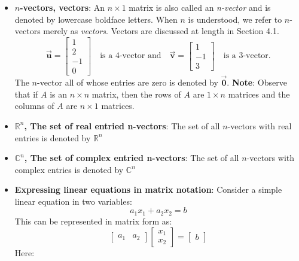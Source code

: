 \documentclass{report}
\begin{document}
\begin{itemize}
         \item \textbf{$n$-vectors, vectors}:
             An $n \times 1$ matrix is also called an \textit{n-vector} and is denoted by lowercase boldface letters. When $n$ is understood, we refer to $n$-vectors merely as \textit{vectors}. Vectors are discussed at length in Section 4.1.
             \[
                 \vec{\mathbf{u}} = \begin{bmatrix} 1 \\ 2 \\ -1 \\ 0 \end{bmatrix} \quad \text{is a 4-vector and} \quad \vec{\mathbf{v}} = \begin{bmatrix} 1 \\ -1 \\ 3 \end{bmatrix} \quad \text{is a 3-vector.}
             \]
             The $n$-vector all of whose entries are zero is denoted by $\vec{\mathbf{0}}$.
             \bigbreak \noindent 
             \textbf{Note}: Observe that if $A$ is an $n \times n$ matrix, then the rows of $A$ are $1 \times n$ matrices and the columns of $A$ are $n \times 1$ matrices. 
         \item \textbf{$\mathbb{R}^{n}$, The set of real entried n-vectors}: The set of all $n$-vectors with real entries is denoted by $\mathbb{R}^{n}$
         \item \textbf{$\mathbb{C}^{n}$, The set of complex entried n-vectors}: The set of all $n$-vectors with complex entries is denoted by $\mathbb{C}^{n}$
         \item \textbf{Expressing linear equations in matrix notation}:
             Consider a simple linear equation in two variables:
             \[
                 a_1x_1 + a_2x_2 = b
             \]
             This can be represented in matrix form as:
             \[
                 \begin{bmatrix}
                     a_1 & a_2
                 \end{bmatrix}
                 \begin{bmatrix}
                     x_1 \\
                     x_2
                 \end{bmatrix}
                 =
                 \begin{bmatrix}
                     b
                 \end{bmatrix}
             \]
             Here:
             \begin{itemize}

\end{itemize}
\end{itemize}
\end{document}
